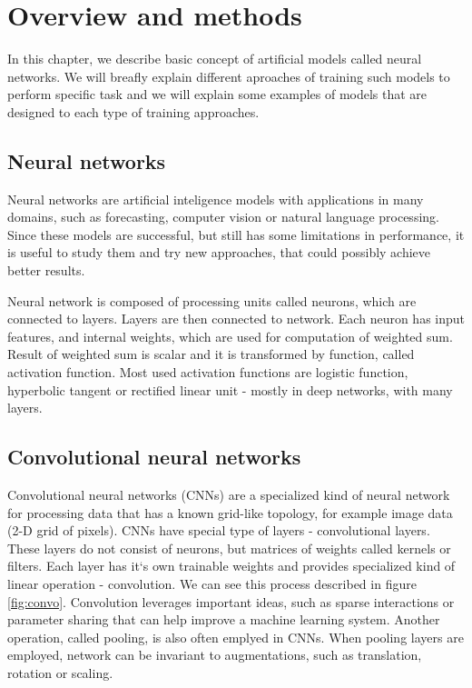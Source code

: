 \chapter{Overview and methods}
\label{chap:overwiev} %
In this chapter, we describe basic concept of artificial models called neural networks. We will breafly explain different aproaches of training such models to perform specific task and we will explain some examples of models that are designed to each type of training approaches.

\section{Neural networks} \label{sec:nn}

Neural networks are artificial inteligence models with applications in many domains, such as forecasting, computer vision or natural language processing. Since these models are successful, but still has some limitations in performance, it  is useful to study them and try new approaches, that could possibly achieve better results.

Neural network is composed of processing units called neurons, which are connected to layers. Layers are then connected to network. Each neuron has input features, and internal weights, which are used for computation of weighted sum. Result of weighted sum is scalar and it is transformed by function, called activation function. Most used activation functions are logistic function, hyperbolic tangent or rectified linear unit - mostly in deep networks, with many layers.

\section{Convolutional neural networks}
Convolutional neural networks (CNNs) are a specialized kind of neural network for processing data
that has a known grid-like topology, for example image data (2-D grid of pixels).
CNNs have special type of layers - convolutional layers. These layers do not consist of neurons, but matrices of weights called kernels or filters. Each layer has it`s own trainable weights and provides specialized kind of linear operation - convolution. We can see this process described in figure \ref{fig:convo}. Convolution leverages important ideas, such as sparse interactions or parameter sharing that can help improve a machine learning system. Another operation, called pooling, is also often emplyed in CNNs. When pooling layers are employed, network can be invariant to augmentations, such as translation, rotation or scaling. \cite{Goodfellow-et-al-2016} 

